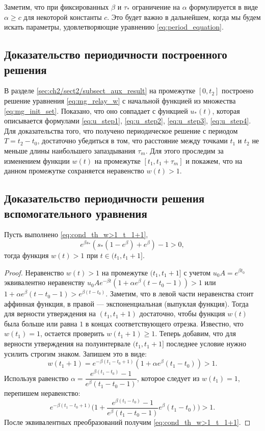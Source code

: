 Заметим, что при фиксированных $\beta$ и $\tau_*$ ограничение на $\alpha$ формулируется в виде $\alpha \geq c$ для некоторой константы $c$. Это будет важно в дальнейшем, когда мы будем искать параметры, удовлетворяющие уравнению \eqref{eq:period_equation}.


\subsection{Доказательство периодичности построенного решения}
В разделе \ref{sec:ch2/sect2/subsect_aux_result} на промежутке $[0,t_2]$ построено решение уравнения \eqref{eq:mg_relay_w} с начальной функцией из множества \eqref{eq:mg_init_set}. Показано, что оно совпадает с функцией $u_*(t)$, которая описывается формулами \eqref{eq:u_step1}, \eqref{eq:u_step2}, \eqref{eq:u_step3}, \eqref{eq:u_step4}. Для доказательства того, что получено периодическое решение с периодом $T = t_2 - t_0$, достаточно убедиться в том, что расстояние между точками $t_1$ и $t_2$ не меньше длины наибольшего запаздывания $\tau_m$. Для этого проследим за изменением функции $w(t)$ на промежутке $[t_1,t_1+\tau_m]$ и покажем, что на данном промежутке сохраняется неравенство $w(t) > 1$.

\subsection{Доказательство периодичности решения вспомогательного уравнения}

\begin{proposition}
	\label{w>1_t_1-t_1+1} Пусть выполнено \eqref{eq:cond_th_w>1_t_1+1},
	\begin{equation}
		\label{w>1_t_1+1}
		e^{\beta s_*}\left(s_*(1-e^\beta) + e^\beta \right) - 1 > 0,
	\end{equation}
	тогда функция $w(t)>1$ при $t\in (t_1, t_1 + 1]$.
\end{proposition}
\begin{proof}
	Неравенство $w(t)>1$ на промежутке $(t_1, t_1 + 1]$ с учетом $u_0 A = e^{\beta t_0}$ эквивалентно неравенству $u_0Ae^{-\beta t}(1+\alpha e^{\beta }(t-t_0-1)) >1$ или $1+\alpha e^{\beta }(t-t_0-1) > e^{\beta (t-t_0)}$.
	Заметим, что в левой части неравенства стоит аффинная функция, в правой --- экспоненциальная (выпуклая функция). Тогда для верности утверждения на $(t_1, t_1 + 1)$ достаточно, чтобы функция $w(t)$ была больше или равна $1$ в концах соответствующего отрезка. Известно, что $w(t_1) = 1$, остается проверить $w(t_1+1) \geqslant 1$. Теперь добавим, что для верности утверждения на полуинтервале $(t_1, t_1 + 1]$ последнее условие нужно усилить строгим знаком.
	Запишем это в виде:
	$$w(t_1+1) = e^{-\beta (t_1 -t_0+ 1)}( 1+\alpha e^{\beta }(t_1-t_0) )>1 .$$
	Используя равенство $\alpha = \dfrac{e^{\beta(t_1 - t_0)}-1}{e^\beta(t_1 - t_0 -1)}$, которое следует из $w(t_1)=1$, перепишем неравенство:
	$$e^{-\beta(t_1-t_0+1)}\Big(1 + \dfrac{e^{\beta(t_1 - t_0)}-1}{e^\beta(t_1 - t_0 -1)}e^\beta(t_1 - t_0) \Big)>1.$$
	После эквивалентных преобразований получим \eqref{eq:cond_th_w>1_t_1+1}.
\end{proof}

